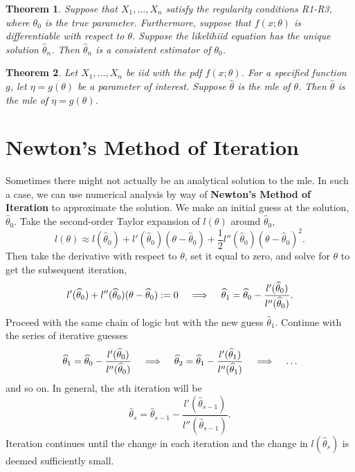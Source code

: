 \documentclass[12pt]{article}
\newcommand{\thetahat}{\hat{\theta}}
\renewcommand{\hat}[1]{\widehat{#1}}
\newcommand{\Lindent}{\hspace{.4cm} \Longrightarrow \hspace{.4cm}}
\newtheorem{theorem}{Theorem}
\theoremstyle{definition}
\begin{document}
 \begin{theorem}
 	Suppose that $X_1, \hdots, X_n$ satisfy the regularity conditions R1-R3, where $\theta_0$ is the true parameter. Furthermore, suppose that $f(x;\theta)$ is differentiable with respect to $\theta$. Suppose the likelihiid equation has the unique solution $\thetahat_n$. Then $\thetahat_n$ is a consistent estimator of $\theta_0$. 
 \end{theorem}
 
\begin{theorem}
	Let $X_1, \hdots, X_n$ be iid with the pdf $f(x;\theta)$. For a specified function $g$, let $\eta =g(\theta)$ be a parameter of interest. Suppose $\hat{\theta}$ is the mle of $\theta$. Then $\thetahat$ is the mle of $\eta = g(\theta)$. 
\end{theorem}




\section{Newton's Method of Iteration}

Sometimes there might not actually be an analytical solution to the mle. In such a case, we can use numerical analysis by way of \textbf{Newton's Method of Iteration} to approximate the solution. We make an initial guess at the solution, $\widehat{\theta}_0$. Take the second-order Taylor expansion of $l(\theta)$ around $\hat{\theta}_0$,
	\[
		l(\theta) \approx l(\hat{\theta}_0) + l'(\hat{\theta}_0)(\theta - \hat{\theta}_0) + \frac{1}{2} l''(\hat{\theta}_0)(\theta - \hat{\theta}_0)^2.	
	\]	
Then take the derivative with respect to $\theta$, set it equal to zero, and solve for $\theta$ to get the subsequent iteration, 
	\[l'(\hat{\theta}_0) +  l''(\hat{\theta}_0)(\theta - \hat{\theta}_0):=0	\Lindent	\hat{\theta}_1 = \hat{\theta}_0 - \frac{l'(\hat{\theta}_0)}{l''(\hat{\theta}_0)}.\]
Proceed with the same chain of logic but with the new guess $\hat{\theta}_1$. Continue with the series of iterative guesses
	\[\hat{\theta}_1 = \hat{\theta}_0 - \frac{l'(\hat{\theta}_0)}{l''(\hat{\theta}_0)} \Lindent  \hat{\theta}_2 = \hat{\theta}_1 - \frac{l'(\hat{\theta}_1)}{l''(\hat{\theta}_1)} \Lindent \hdots	\]
and so on. In general, the $s$th iteration will be
	\[	\hat{\theta}_{s} = \hat{\theta}_{s-1} - \frac{l'(\hat{\theta}_{s-1})}{l''(\hat{\theta}_{s-1})}.		\]
Iteration continues until the change in each iteration and the change in $l(\hat{\theta}_s)$ is deemed sufficiently small. 
\end{document}
